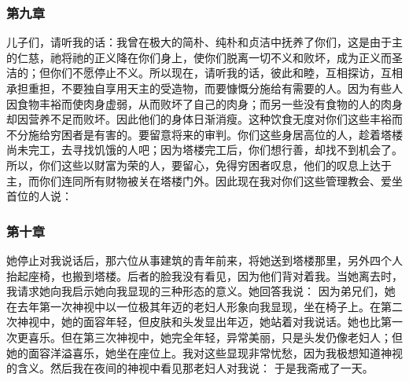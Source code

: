
\subsubsection{第九章}

儿子们，请听我的话：我曾在极大的简朴、纯朴和贞洁中抚养了你们，这是由于主的仁慈，祂将祂的正义降在你们身上，使你们脱离一切不义和败坏，成为正义而圣洁的；但你们不愿停止不义。所以现在，请听我的话，彼此和睦，互相探访，互相承担重担，不要独自享用天主的受造物，而要慷慨分施给有需要的人。因为有些人因食物丰裕而使肉身虚弱，从而败坏了自己的肉身；而另一些没有食物的人的肉身却因营养不足而败坏。因此他们的身体日渐消瘦。这种饮食无度对你们这些丰裕而不分施给穷困者是有害的。要留意将来的审判。你们这些身居高位的人，趁着塔楼尚未完工，去寻找饥饿的人吧；因为塔楼完工后，你们想行善，却找不到机会了。所以，你们这些以财富为荣的人，要留心，免得穷困者叹息，他们的叹息上达于主，而你们连同所有财物被关在塔楼门外。因此现在我对你们这些管理教会、爱坐首位的人说：\par


\subsubsection{第十章}

她停止对我说话后，那六位从事建筑的青年前来，将她送到塔楼那里，另外四个人抬起座椅，也搬到塔楼。后者的脸我没有看见，因为他们背对着我。当她离去时，我请求她向我启示她向我显现的三种形态的意义。她回答我说： 因为弟兄们，她在去年第一次神视中以一位极其年迈的老妇人形象向我显现，坐在椅子上。在第二次神视中，她的面容年轻，但皮肤和头发显出年迈，她站着对我说话。她也比第一次更喜乐。但在第三次神视中，她完全年轻，异常美丽，只是头发仍像老妇人；但她的面容洋溢喜乐，她坐在座位上。我对这些显现非常忧愁，因为我极想知道神视的含义。然后我在夜间的神视中看见那老妇人对我说： 于是我斋戒了一天。\par

